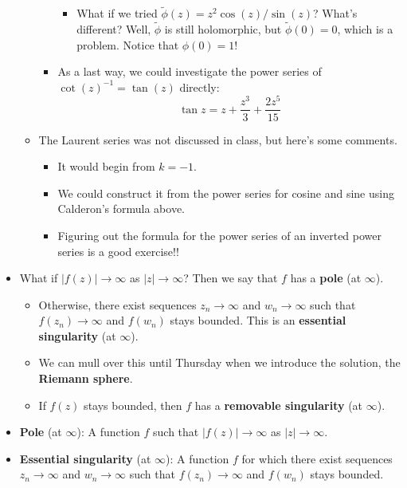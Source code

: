 \documentclass[../notes.tex]{subfiles}
\begin{document}
\begin{itemize}
\begin{itemize}
\begin{itemize}
            \begin{itemize}
                \item What if we tried $\tilde{\phi}(z)=z^2\cos(z)/\sin(z)$? What's different? Well, $\tilde{\phi}$ is still holomorphic, but $\tilde{\phi}(0)=0$, which is a problem. Notice that $\phi(0)=1$!
            \end{itemize}
            \item As a last way, we could investigate the power series of $\cot(z)^{-1}=\tan(z)$ directly:
            \begin{equation*}
                \tan z = z+\frac{z^3}{3}+\frac{2z^5}{15}
            \end{equation*}
        \end{itemize}
        \item The Laurent series was not discussed in class, but here's some comments.
        \begin{itemize}
            \item It would begin from $k=-1$.
            \item We could construct it from the power series for cosine and sine using Calderon's formula above.
            \item Figuring out the formula for the power series of an inverted power series is a good exercise!!
        \end{itemize}
    \end{itemize}
    \item What if $|f(z)|\to\infty$ as $|z|\to\infty$? Then we say that $f$ has a \textbf{pole} (at $\infty$).
    \begin{itemize}
        \item Otherwise, there exist sequences $z_n\to\infty$ and $w_n\to\infty$ such that $f(z_n)\to\infty$ and $f(w_n)$ stays bounded. This is an \textbf{essential singularity} (at $\infty$).
        \item We can mull over this until Thursday when we introduce the solution, the \textbf{Riemann sphere}.
        \item If $f(z)$ stays bounded, then $f$ has a \textbf{removable singularity} (at $\infty$).
    \end{itemize}
    \item \textbf{Pole} (at $\infty$): A function $f$ such that $|f(z)|\to\infty$ as $|z|\to\infty$.
    \item \textbf{Essential singularity} (at $\infty$): A function $f$ for which there exist sequences $z_n\to\infty$ and $w_n\to\infty$ such that $f(z_n)\to\infty$ and $f(w_n)$ stays bounded.

\end{itemize}
\end{document}
